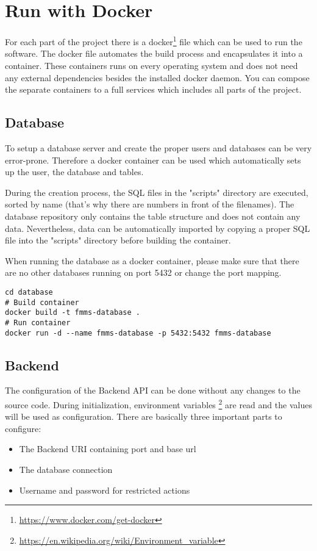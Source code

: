 
\chapter{Run with Docker}

For each part of the project there is a docker\footnote{\url{https://www.docker.com/get-docker}}  file which can be used to run the software.
The docker file automates the build process and encapsulates it into a container.
These containers runs on every operating system and does not need any external dependencies besides the installed docker daemon.
You can compose the separate containers to a full services which includes all parts of the project.

\section{Database}
\label{docker:db}

To setup a database server and create the proper users and databases can be very error-prone. 
Therefore a docker container can be used which automatically sets up the user, the database and tables.

During the creation process, the SQL files in the "scripts" directory are executed, sorted by name (that's why there are numbers in front of the filenames).
The database repository only contains the table structure and does not contain any data. Nevertheless, data can be automatically imported by copying a proper SQL file into the "scripts" directory before building the container.

When running the database as a docker container, please make sure that there are no other databases running on port 5432 or change the port mapping.

\begin{minipage}{\textwidth}
\begin{lstlisting}[caption={Build and run Database Container}]
cd database
# Build container
docker build -t fmms-database .
# Run container
docker run -d --name fmms-database -p 5432:5432 fmms-database
\end{lstlisting}
\end{minipage}

\section{Backend}
\label{docker:backend}

The configuration of the Backend API can be done without any changes to the source code.
During initialization, environment variables \footnote{\url{https://en.wikipedia.org/wiki/Environment_variable}} are read and the values will be used as configuration.
There are basically three important parts to configure:
\begin{itemize}
	\item The Backend URI containing port and base url
	\item The database connection
	\item Username and password for restricted actions
\end{itemize}

